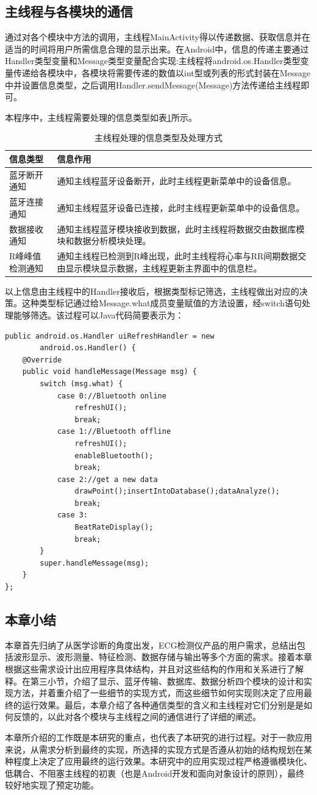 \subsection{主线程与各模块的通信}
通过对各个模块中方法的调用，主线程MainActivity得以传递数据、获取信息并在适当的时间将用户所需信息合理的显示出来。在Android中，信息的传递主要通过Handler类型变量和Message类型变量配合实现:主线程将android.os.Handler类型变量传递给各模块中，各模块将需要传递的数值以int型或列表的形式封装在Message中并设置信息类型，之后调用Handler.sendMessage(Message)方法传递给主线程即可。

本程序中，主线程需要处理的信息类型如表\ref{t1}所示。
\begin{table}[htbp]
  \centering
  \caption{主线程处理的信息类型及处理方式
  \label{t1}}
  \wuhao
\begin{tabular}{|p{}|p{}|}
\hline 
信息类型 & 信息作用 \\ 
\hline 
蓝牙断开通知 & 通知主线程蓝牙设备断开，此时主线程更新菜单中的设备信息。 \\ 
\hline 
蓝牙连接通知 & 通知主线程蓝牙设备已连接，此时主线程更新菜单中的设备信息。 \\ 
\hline 
数据接收通知 & 通知主线程蓝牙模块接收到数据，此时主线程将数据交由数据库模块和数据分析模块处理。 \\ 
\hline 
R峰峰值检测通知 & 通知主线程已检测到R峰出现，此时主线程将心率与RR间期数据交由显示模块显示数据，主线程更新主界面中的信息栏。 \\ 
\hline 
\end{tabular} 
\end{table}
以上信息由主线程中的Handler接收后，根据类型标记筛选，主线程做出对应的决策。这种类型标记通过给Message.what成员变量赋值的方法设置，经switch语句处理能够筛选。该过程可以Java代码简要表示为：

\begin{center}
\begin{lstlisting}
public android.os.Handler uiRefreshHandler = new 
		android.os.Handler() {
	@Override
	public void handleMessage(Message msg) {
		switch (msg.what) {
			case 0://Bluetooth online
				refreshUI();
				break;
			case 1://Bluetooth offline
				refreshUI();
				enableBluetooth();
				break;
			case 2://get a new data
				drawPoint();insertIntoDatabase();dataAnalyze();
				break;
			case 3:
				BeatRateDisplay();
				break;
		}
		super.handleMessage(msg);
	}
};
\end{lstlisting}
\end{center}

\subsection{本章小结}
本章首先归纳了从医学诊断的角度出发，ECG检测仪产品的用户需求，总结出包括波形显示、波形测量、特征检测、数据存储与输出等多个方面的需求。接着本章根据这些需求设计出应用程序具体结构，并且对这些结构的作用和关系进行了解释。在第三小节，介绍了显示、蓝牙传输、数据库、数据分析四个模块的设计和实现方法，并着重介绍了一些细节的实现方式，而这些细节如何实现则决定了应用最终的运行效果。最后，本章介绍了各种通信类型的含义和主线程对它们分别是是如何反馈的，以此对各个模块与主线程之间的通信进行了详细的阐述。

本章所介绍的工作既是本研究的重点，也代表了本研究的进行过程。对于一款应用来说，从需求分析到最终的实现，所选择的实现方式是否遵从初始的结构规划在某种程度上决定了应用最终的运行效果。本研究中的应用实现过程严格遵循模块化、低耦合、不阻塞主线程的初衷（也是Android开发和面向对象设计的原则），最终较好地实现了预定功能。
